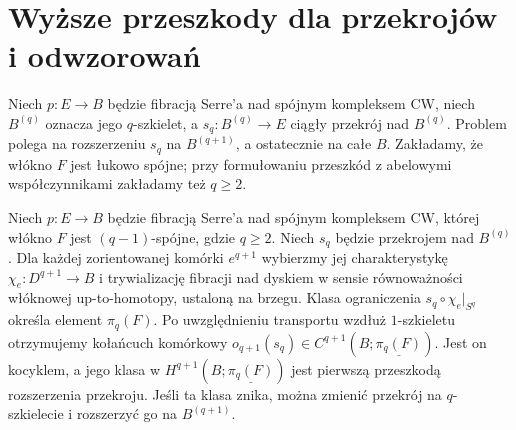 \section{Wyższe przeszkody dla przekrojów i odwzorowań}
\begin{definicja}
Niech $p:E\to B$ będzie fibracją Serre'a nad spójnym kompleksem CW,
niech $B^{(q)}$ oznacza jego $q$-szkielet, a $s_q:B^{(q)}\to E$
ciągły przekrój nad $B^{(q)}$. Problem polega na rozszerzeniu
$s_q$ na $B^{(q+1)}$, a ostatecznie na całe $B$.
Zakładamy, że włókno $F$ jest łukowo spójne; przy formułowaniu
przeszkód z abelowymi współczynnikami zakładamy też $q\ge2$.
\end{definicja}
\begin{stwierdzenie}
\label{prop:xviii-obstruction}
Niech $p:E\to B$ będzie fibracją Serre'a nad spójnym
kompleksem CW, której włókno $F$ jest $(q-1)$-spójne,
gdzie $q\ge2$. Niech $s_q$ będzie przekrojem nad $B^{(q)}$.
Dla każdej zorientowanej komórki $e^{q+1}$ wybierzmy
jej charakterystykę $\chi_e:D^{q+1}\to B$ i trywializację
fibracji nad dyskiem w sensie równoważności włóknowej
up-to-homotopy, ustaloną na brzegu. Klasa ograniczenia
$s_q\circ\chi_e|_{S^q}$ określa element $\pi_q(F)$.
Po uwzględnieniu transportu wzdłuż $1$-szkieletu otrzymujemy
kołańcuch komórkowy
$o_{q+1}(s_q)\in C^{q+1}(B;\underline{\pi_q(F)})$.
Jest on kocyklem, a jego klasa w
$H^{q+1}(B;\underline{\pi_q(F)})$ jest pierwszą przeszkodą
rozszerzenia przekroju. Jeśli ta klasa znika, można zmienić
przekrój na $q$-szkielecie i rozszerzyć go na $B^{(q+1)}$.
\end{stwierdzenie}

